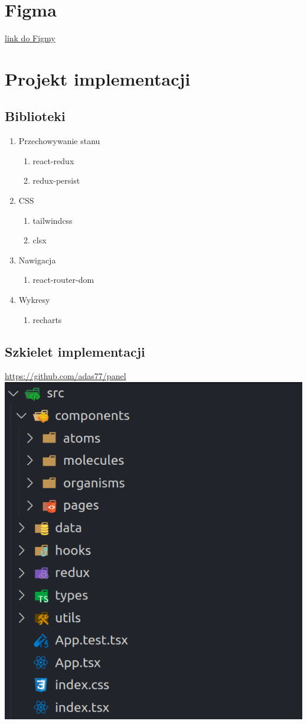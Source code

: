\documentclass[a4paper,11pt]{article}
\begin{document}
\section{Figma}
\href{https://www.figma.com/file/6HQmM9ssZsjX2jbWcm6bmN/PGUI_PANEL_SPRZEDAWCY?node-id=0%3A1&t=sC3RxEjXZwQHD2Ov-0}{link do Figmy}
\section{Projekt implementacji}
\subsection{Biblioteki}
\begin{enumerate}
    \item Przechowywanie stanu
    \begin{enumerate}
        \item react-redux
        \item redux-persist
    \end{enumerate}
    \item CSS
    \begin{enumerate}
        \item tailwindcss
        \item clsx
    \end{enumerate}
    \item Nawigacja
    \begin{enumerate}
        \item react-router-dom
    \end{enumerate}
    \item Wykresy
    \begin{enumerate}
        \item recharts
    \end{enumerate}
\end{enumerate}
\subsection{Szkielet implementacji}
\url{https://github.com/adas77/panel} \\
\includegraphics[scale=0.5]{src/s.png}

% 
\end{document}
